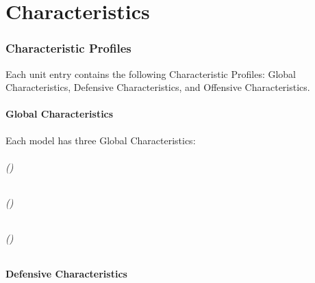 
\part{Characteristics}
\label{characteristics}

\RBbmc

\section{Characteristic Profiles}
\label{the_characteristics_profiles}

Each unit entry contains the following Characteristic Profiles: Global Characteristics, Defensive Characteristics, and Offensive Characteristics.

\subsection{Global Characteristics}

Each model has three Global Characteristics:

\paragraph{\AdvanceRateInitials{} (\AdvanceRate{})}


\paragraph{\MarchRateInitials{} (\MarchRate{})}


\paragraph{\DisciplineInitials{} (\Discipline{})}


\subsection{Defensive Characteristics}


